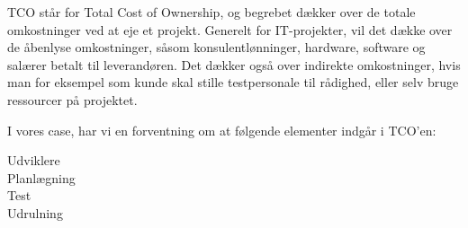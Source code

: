 TCO står for Total Cost of Ownership, og begrebet dækker over de totale
omkostninger ved at eje et projekt. Generelt for IT-projekter, vil det dække
over de åbenlyse omkostninger, såsom konsulentlønninger, hardware, software og
salærer betalt til leverandøren. Det dækker også over indirekte omkostninger,
hvis man for eksempel som kunde skal stille testpersonale til rådighed, eller
selv bruge ressourcer på projektet.

I vores case, har vi en forventning om at følgende elementer indgår i TCO'en:

\begin{description}
\item[Udviklere]
\item[Planlægning]
\item[Test]
\item[Udrulning]
\end{description}

